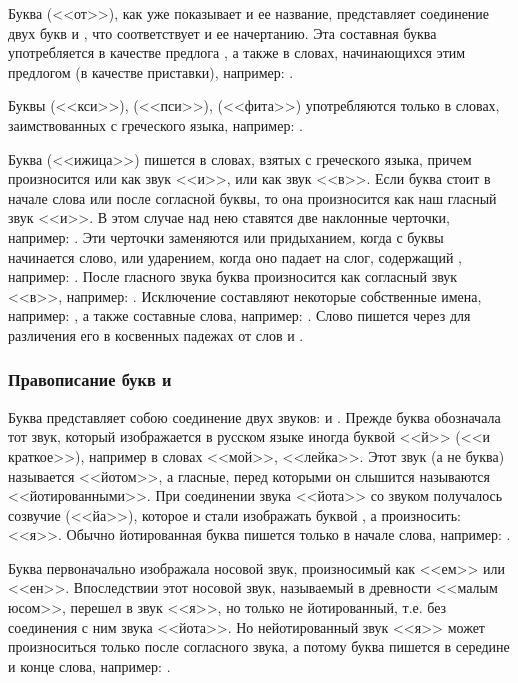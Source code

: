 \documentclass[11pt,a4paper,oneside]{memoir}
\begin{document}
Буква {} (<<от>>), как уже показывает и ее название, представляет соединение двух букв {} и {}, что соответствует и ее начертанию. Эта составная буква употребляется в качестве предлога {}, а также в словах, начинающихся этим предлогом (в качестве приставки), например: {}.

Буквы {} (<<кси>>), {} (<<пси>>), {} (<<фита>>) употребляются только в словах, заимствованных с греческого языка, например: {}.

Буква {} (<<ижица>>) пишется в словах, взятых с греческого языка, причем произносится или как звук <<и>>, или как звук <<в>>. Если буква {} стоит в начале слова или после согласной буквы, то она произносится как наш гласный звук <<и>>. В этом случае над нею ставятся две наклонные черточки, например: {}. Эти черточки заменяются или придыханием, когда с буквы {} начинается слово, или ударением, когда оно падает на слог, содержащий {}, например: {}. После гласного звука буква {} произносится как согласный звук <<в>>, например: {}. Исключение составляют некоторые собственные имена, например: {}, а также составные слова, например: {}. Слово {} пишется через {} для различения его в косвенных падежах от слов {} и {}.


\subsubsection{Правописание букв {\large{}} и {\large{}}}

Буква {} представляет собою соединение двух звуков: {} и {}. Прежде буква {} обозначала тот звук, который изображается в русском языке иногда буквой <<й>> (<<и краткое>>), например в словах <<мой>>, <<лейка>>. Этот звук (а не буква) называется <<йотом>>, а гласные, перед которыми он слышится называются <<йотированными>>. При соединении звука <<йота>> со звуком {} получалось созвучие {} (<<йа>>), которое и стали изображать буквой {}, а произносить: <<я>>. Обычно йотированная буква {} пишется только в начале слова, например: {}.

Буква {} первоначально изображала носовой звук, произносимый как <<ем>> или <<ен>>. Впоследствии этот носовой звук, называемый в древности <<малым юсом>>, перешел в звук <<я>>, но только не йотированный, т.е. без соединения с ним звука <<йота>>. Но нейотированный звук <<я>> может произноситься только после согласного звука, а потому буква {} пишется в середине и конце слова, например: {}.
\end{document}
